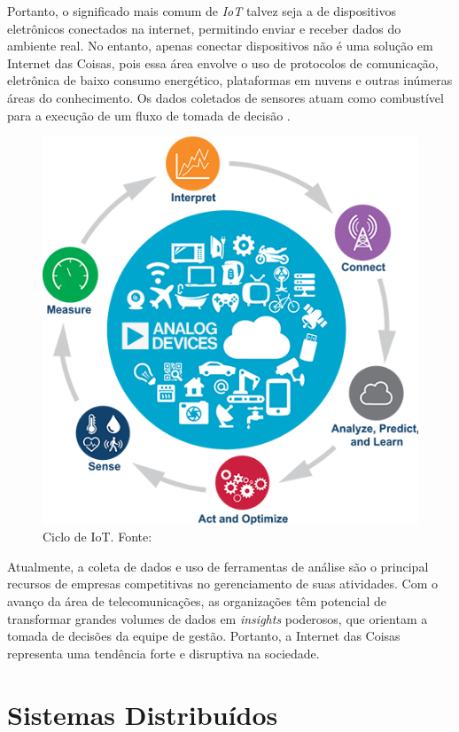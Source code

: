 Portanto, o significado mais comum de \textit{IoT} talvez seja a de dispositivos eletrônicos conectados na internet, permitindo enviar e receber dados do ambiente real. No entanto, apenas conectar dispositivos não é uma solução em Internet das Coisas, pois essa área envolve o uso de protocolos de comunicação, eletrônica de baixo consumo energético, plataformas em nuvens e outras inúmeras áreas do conhecimento. Os dados coletados de sensores atuam como combustível para a execução de um fluxo de tomada de decisão \cite{iot-cycle}. 

\begin{figure}[ht]
    \centering
    \includegraphics[width=.50\textwidth]{img/iot-cycle.png}
    \caption{Ciclo de IoT. Fonte:\cite{iot-cycle}}\label{figIoTCycle}
\end{figure}

Atualmente, a coleta de dados e uso de ferramentas de análise são o principal recursos de empresas competitivas no gerenciamento de suas atividades. Com o avanço da área de telecomunicações, as organizações têm potencial de transformar grandes volumes de dados em \textit{insights} poderosos, que orientam a tomada de decisões da equipe de gestão. Portanto, a Internet das Coisas representa uma tendência forte e disruptiva na sociedade.

\section{Sistemas Distribuídos}

